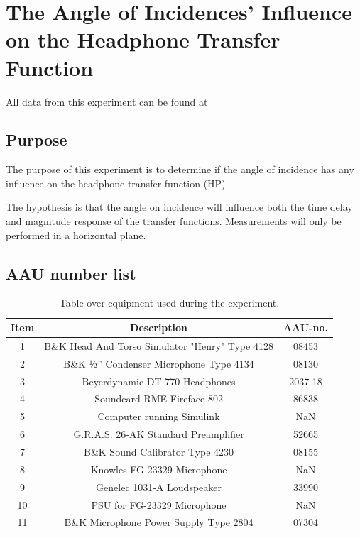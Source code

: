
\section{The Angle of Incidences' Influence on the Headphone Transfer Function} \label{sec:AngleOfIncidence}

All data from this experiment can be found at

\subsection{Purpose}
The purpose of this experiment is to determine if the angle of incidence has any influence on the headphone transfer function (HP). 

The hypothesis is that the angle on incidence will influence both the time delay and magnitude response of the transfer functions. Measurements will only be performed in a horizontal plane. 

\subsection{AAU number list}


\begin{table}[H]
	\centering
	\begin{tabular}{ c c c } \toprule
		{Item}	& {Description} 						& {AAU-no}. \\ \bottomrule 
		1	&	B\&K Head And Torso Simulator "Henry" Type 4128	& 08453	\\
		2	&	B\&K ½'' Condenser Microphone Type 4134 	& 08130		\\
		3	&	Beyerdynamic DT 770 Headphones				& 2037-18		\\
		4	&	Soundcard RME Fireface 802					& 86838		\\
		5	&	Computer running Simulink								& NaN		\\
		6	&	G.R.A.S. 26-AK Standard Preamplifier		& 52665		\\
		7	&	B\&K Sound Calibrator Type 4230				& 08155		\\ 
		8	&	Knowles FG-23329 Microphone					& NaN		\\
		9	&	Genelec 1031-A Loudspeaker								& 33990		\\ 
		10	&	PSU for FG-23329  Microphone	& NaN\\
		11	& 	B\&K Microphone Power Supply Type 2804		& 07304		\\
		\bottomrule
	\end{tabular}
	\caption{Table over equipment used during the experiment.}
	\label{tab:AngleOfIncideceHP}
\end{table}

